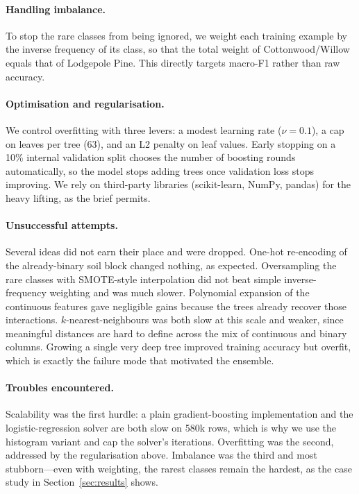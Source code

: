 \documentclass[sigconf,nonacm]{acmart}
\begin{document}
\paragraph{Handling imbalance.}
To stop the rare classes from being ignored, we weight each training example by
the inverse frequency of its class, so that the total weight of Cottonwood/Willow
equals that of Lodgepole Pine. This directly targets macro-F1 rather than raw
accuracy.

\paragraph{Optimisation and regularisation.}
We control overfitting with three levers: a modest learning rate
($\nu=0.1$), a cap on leaves per tree (63), and an L2 penalty on leaf values.
Early stopping on a 10\% internal validation split chooses the number of boosting
rounds automatically, so the model stops adding trees once validation loss stops
improving. We rely on third-party libraries (scikit-learn, NumPy, pandas) for the
heavy lifting, as the brief permits.

\paragraph{Unsuccessful attempts.}
Several ideas did not earn their place and were dropped. One-hot re-encoding of
the already-binary soil block changed nothing, as expected. Oversampling the rare
classes with SMOTE-style interpolation did not beat simple inverse-frequency
weighting and was much slower. Polynomial expansion of the continuous features
gave negligible gains because the trees already recover those interactions.
$k$-nearest-neighbours was both slow at this scale and weaker, since meaningful
distances are hard to define across the mix of continuous and binary columns.
Growing a single very deep tree improved training accuracy but overfit, which is
exactly the failure mode that motivated the ensemble.

\paragraph{Troubles encountered.}
Scalability was the first hurdle: a plain gradient-boosting implementation and
the logistic-regression solver are both slow on 580k rows, which is why we use
the histogram variant and cap the solver's iterations. Overfitting was the
second, addressed by the regularisation above. Imbalance was the third and most
stubborn---even with weighting, the rarest classes remain the hardest, as the
case study in Section~\ref{sec:results} shows.
\end{document}
